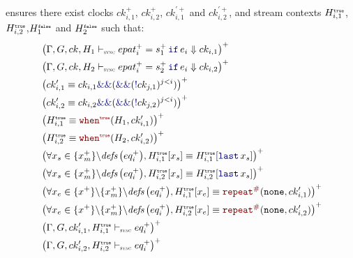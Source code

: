 \begin{skippableproof}
\begin{itemize}
               ensures there exist clocks $ck_{i, 1}^+$,
              $ck_{i, 2}^+$, $ck_{i, 1}^{\prime+}$ and $ck_{i, 2}^{\prime+}$, and stream contexts
              $H^{\mbox{\tiny\ensuremath{\mathtt{{true}}}}}_{i, 1}$, $H^{\mbox{\tiny\ensuremath{\mathtt{{true}}}}}_{i, 2}$,$H^{\mbox{\tiny\ensuremath{\mathtt{{false}}}}}_1$ and $H^{\mbox{\tiny\ensuremath{\mathtt{{false}}}}}_2$ such that:
              \begin{align*}
                   & \left(\patDenot{H_1}{ck}{\guarded{epat_i^+ = s_1^+}{e_i}}{ck_{i, 1}}\right)^+                                                           \\
                   & \left(\patDenot{H_2}{ck}{\guarded{epat_i^+ = s_2^+}{e_i}}{ck_{i, 2}}\right)^+                                                           \\
                   & \left(ck'_{i, 1} \equiv ck_{i, 1} \kwf{\&\&} (\kwf{\&\&}(\kwf{!}ck_{j, 1})^{j < i})\right)^+                                            \\
                   & \left(ck'_{i, 2} \equiv ck_{i, 2} \kwf{\&\&} (\kwf{\&\&}(\kwf{!}ck_{j, 2})^{j < i})\right)^+                                            \\
                   & \left(H^\T_{i, 1} \equiv \whenT{H_1}{ck'_{i, 1}}\right)^+                                                                               \\
                   & \left(H^\T_{i, 2} \equiv \whenT{H_2}{ck'_{i, 2}}\right)^+                                                                               \\
                   & \left(\forall x_s \in \{x_m^+\} \backslash \defs{eq_i^+}, H^\T_{i, 1}[x_s] \equiv H^\T_{i, 1}[\last{x_s}]\right)^+                      \\
                   & \left(\forall x_s \in \{x_m^+\} \backslash \defs{eq_i^+}, H^\T_{i, 2}[x_s] \equiv H^\T_{i, 2}[\last{x_s}]\right)^+                      \\
                   & \left(\forall x_e \in \{x^+\} \backslash \{x_m^+\} \backslash \defs{eq_i^+}, H^\T_{i, 1}[x_e] \equiv \const{\none}{ck'_{i, 1}}\right)^+ \\
                   & \left(\forall x_e \in \{x^+\} \backslash \{x_m^+\} \backslash \defs{eq_i^+}, H^\T_{i, 2}[x_e] \equiv \const{\none}{ck'_{i, 2}}\right)^+ \\
                   & \left(\eqDenot{H^\T_{i, 1}}{ck'_{i, 1}}{eq_i^+}\right)^+                                                                                \\
                   & \left(\eqDenot{H^\T_{i, 2}}{ck'_{i, 2}}{eq_i^+}\right)^+                                                                                \\

\end{align*}
\end{itemize}
\end{skippableproof}

